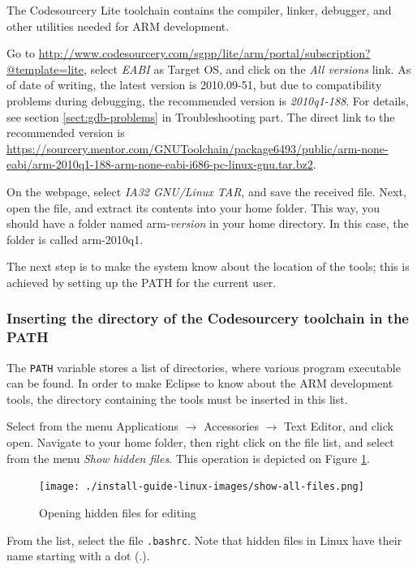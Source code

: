 \documentclass[a4paper, 10pt]{article}
\begin{document}
The Codesourcery Lite toolchain contains
the compiler, linker, debugger, and other utilities needed for
ARM development.

Go to
\url{http://www.codesourcery.com/sgpp/lite/arm/portal/subscription?@template=lite},
select \emph{EABI} as Target OS, and click on the
\emph{All versions} link.
As of date of writing, the latest version is 2010.09-51, but
due to compatibility problems during debugging, the recommended version is \emph{2010q1-188}.
For details, see section \ref{sect:gdb-problems} in Troubleshooting part.
The direct link to the recommended version is
\url{https://sourcery.mentor.com/GNUToolchain/package6493/public/arm-none-eabi/arm-2010q1-188-arm-none-eabi-i686-pc-linux-gnu.tar.bz2}.

On the webpage, select \emph{IA32 GNU/Linux TAR},
and save the received file.
Next, open the file, and extract its contents into your home folder.
This way, you should have a folder named arm-\textit{version} in your home directory.
In this case, the folder is called arm-2010q1.

The next step is to make the system know about the location of the tools;
this is achieved by setting up the PATH for the current user.

\subsubsection{Inserting the directory of the Codesourcery toolchain in the PATH}

    \label{sect:change-path}
The \verb+PATH+ variable stores a list of directories, where various
program executable can be found. In order to make Eclipse to know about the
ARM development tools, the directory containing the tools must be inserted
in this list.

Select from the menu Applications $\rightarrow$ Accessories $\rightarrow$ Text Editor,
and click open. Navigate to your home folder, then right click on the file list,
and select from the menu \emph{Show hidden files}. This operation is depicted on Figure
\ref{fig:show-hidden-files}.

    \begin{figure}[H]
    \centering
        \texttt{[image: ./install-guide-linux-images/show-all-files.png]}
        \caption{Opening hidden files for editing}
        \label{fig:show-hidden-files}
    \end{figure}

From the list, select the file \verb+.bashrc+. Note that hidden files in Linux
have their name starting with a dot (.).
\end{document}
